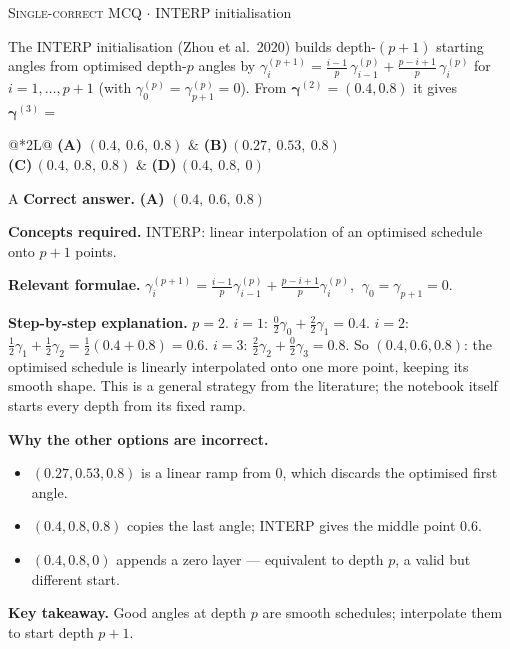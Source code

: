 \documentclass[11pt,a4paper]{article}
\newcommand{\optlabel}[1]{\textbf{(#1)}}
\newcommand{\correctlabel}[1]{\textcolor{okgreen}{\textbf{(#1)}\,\ding{51}}}
\newenvironment{qitem}[1]{\begin{list}{}{\setlength{\leftmargin}{3.3em}\setlength{\labelwidth}{3.1em}%
  \setlength{\labelsep}{0.2em}\setlength{\topsep}{3pt}\setlength{\parsep}{3pt}}\item[\textbf{Q.#1}\hfill]}{\end{list}}
\newcommand{\qsep}{\par\vspace{2pt}{\color{black!15}\hrule}\vspace{4pt}}
\newcommand{\qmeta}[2]{{\footnotesize\color{black!60}\textsc{#1} \;$\cdot$\; #2}\par}
\begin{document}
\begin{qitem}{73}
\qmeta{Single-correct MCQ}{INTERP initialisation}
The INTERP initialisation (Zhou et al.\ 2020) builds depth-$(p+1)$ starting angles from optimised depth-$p$ angles by
$\gamma_i^{(p+1)} = \tfrac{i-1}{p}\,\gamma_{i-1}^{(p)} + \tfrac{p-i+1}{p}\,\gamma_i^{(p)}$ for $i = 1, \dots, p+1$ (with $\gamma_0^{(p)} = \gamma_{p+1}^{(p)} = 0$).
From $\boldsymbol\gamma^{(2)} = (0.4, 0.8)$ it gives $\boldsymbol\gamma^{(3)} =$
\par\smallskip\noindent\begin{tabularx}{\linewidth}{@{}*{2}{L}@{}}
\correctlabel{A}\,$(0.4,\ 0.6,\ 0.8)$ & \optlabel{B}\,$(0.27,\ 0.53,\ 0.8)$ \\[3pt]
\optlabel{C}\,$(0.4,\ 0.8,\ 0.8)$ & \optlabel{D}\,$(0.4,\ 0.8,\ 0)$
\end{tabularx}
\end{qitem}
\begin{solbox}{A}
\textbf{\color{brand}Correct answer.} \textcolor{okgreen}{\textbf{(A)}} $(0.4,\ 0.6,\ 0.8)$

\textbf{\color{brand}Concepts required.} INTERP: linear interpolation of an optimised schedule onto $p+1$ points.

\textbf{\color{brand}Relevant formulae.} $\gamma_i^{(p+1)} = \tfrac{i-1}{p}\gamma_{i-1}^{(p)} + \tfrac{p-i+1}{p}\gamma_i^{(p)}$, $\ \gamma_0 = \gamma_{p+1} = 0$.

\textbf{\color{brand}Step-by-step explanation.} $p = 2$.
$i = 1$: $\tfrac02\gamma_0 + \tfrac22\gamma_1 = 0.4$.
$i = 2$: $\tfrac12\gamma_1 + \tfrac12\gamma_2 = \tfrac12(0.4 + 0.8) = 0.6$.
$i = 3$: $\tfrac22\gamma_2 + \tfrac02\gamma_3 = 0.8$.
So $(0.4, 0.6, 0.8)$: the optimised schedule is linearly interpolated onto one more point, keeping its smooth shape. This is a
general strategy from the literature; the notebook itself starts every depth from its fixed ramp.

\textbf{\color{brand}Why the other options are incorrect.}
\begin{itemize}[leftmargin=2.4em, itemsep=1pt, topsep=2pt]
\item[\textbf{(B)}] $(0.27, 0.53, 0.8)$ is a linear ramp from $0$, which discards the optimised first angle.
\item[\textbf{(C)}] $(0.4, 0.8, 0.8)$ copies the last angle; INTERP gives the middle point $0.6$.
\item[\textbf{(D)}] $(0.4, 0.8, 0)$ appends a zero layer --- equivalent to depth $p$, a valid but different start.
\end{itemize}
\textbf{\color{brand}Key takeaway.} Good angles at depth $p$ are smooth schedules; interpolate them to start depth $p+1$.
\end{solbox}
\qsep
\end{document}
